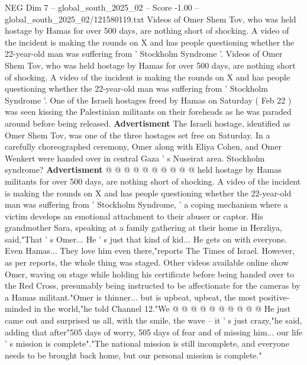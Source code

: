 \begin{textsample}{NEG Dim 7 – global\_south\_2025\_02 – Score -1.00 – global\_south\_2025\_02/121580119.txt}  \label{ex:f7_neg_038}
Videos of Omer Shem Tov, who was held hostage by Hamas for over 500 days, are nothing short of shocking.
A video of the incident is making the rounds on X and has people questioning whether the 22-year-old man was suffering from ' Stockholm Syndrome '.
Videos of Omer Shem Tov, who was held hostage by Hamas for over 500 days, are nothing short of shocking.
A video of the incident is making the rounds on X and has people questioning whether the 22-year-old man was suffering from ' Stockholm Syndrome '.
One of the Israeli hostages freed by Hamas on Saturday ( Feb 22 ) was seen kissing the Palestinian militants on their foreheads as he was paraded around before being released. \textbf{Advertisment} The Israeli hostage, identified as Omer Shem Tov, was one of the three hostages set free on Saturday.
In a carefully choreographed ceremony, Omer along with Eliya Cohen, and Omer Wenkert were handed over in central Gaza ' s Nuseirat area.
Stockholm syndrome? \textbf{Advertisment} @ @ @ @ @ @ @ @ @ @ held hostage by Hamas militants for over 500 days, are nothing short of shocking.
A video of the incident is making the rounds on X and has people questioning whether the 22-year-old man was suffering from ' Stockholm Syndrome, ' a coping mechanism where a victim develops an emotional attachment to their abuser or captor.
His grandmother Sara, speaking at a family gathering at their home in Herzliya, said,"That ' s Omer...
He ' s just that kind of kid...
He gets on with everyone.
Even Hamas...
They love him even there,"reports The Times of Israel.
However, as per reports, the whole thing was staged.
Other videos available online show Omer, waving on stage while holding his certificate before being handed over to the Red Cross, presumably being instructed to be affectionate for the cameras by a Hamas militant."Omer is thinner... but is upbeat, upbeat, the most positive-minded in the world,"he told Channel 12."We @ @ @ @ @ @ @ @ @ @ He just came out and surprised us all, with the smile, the wave -- it ' s just crazy,"he said, adding that after"505 days of worry, 505 days of fear and of missing him... our life ' s mission is complete"."The national mission is still incomplete, and everyone needs to be brought back home, but our personal mission is complete."

\end{textsample}
